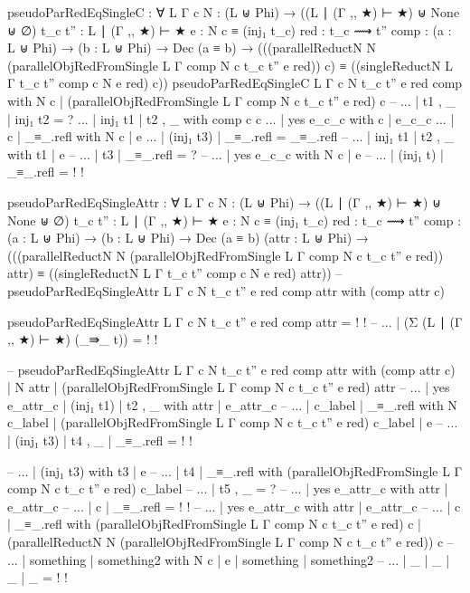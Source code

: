 {\begin{code}
  pseudoParRedEqSingleC : ∀ {L Γ c}
    {N : (L ⊎ Phi) → ((L ∣ (Γ ,, ★) ⊢ ★) ⊎ None ⊎ ∅)}
    {t_c t'' : L ∣ (Γ ,, ★) ⊢ ★}
    {e : N c ≡ (inj₁ t_c)}
    {red : t_c ⟿ t''}
    {comp : (a : L ⊎ Phi) → (b : L ⊎ Phi) → Dec (a ≡ b)}
    → (((parallelReductN N (parallelObjRedFromSingle {L} {Γ} {comp} N c t_c t'' e red)) c)
      ≡ ((singleReductN {L} {Γ} {t_c} {t''} {comp} c N e red) c))
  pseudoParRedEqSingleC  {L} {Γ} {c} {N} {t_c} {t''} {e} {red} {comp} with N c | (parallelObjRedFromSingle {L} {Γ} {comp} N c t_c t'' e red) c
  -- ... | t1 , _ | inj₁ t2 = ?
  ... | inj₁ t1 | t2 , _ with comp c c
  ...   | yes e_c_c with c | e_c_c
  ...     | c | _≡_.refl with N c | e
  ...       | (inj₁ t3) | _≡_.refl = _≡_.refl
  -- ... | inj₁ t1 | t2 , _ with t1 | e
  -- ...   | t3 | _≡_.refl = ?
  -- ...   | yes e_c_c with N c | e
  -- ...     | (inj₁ t) | _≡_.refl = {!   !}


  pseudoParRedEqSingleAttr : ∀ {L Γ c} {N : (L ⊎ Phi) → ((L ∣ (Γ ,, ★) ⊢ ★) ⊎ None ⊎ ∅)} {t_c t'' : L ∣ (Γ ,, ★) ⊢ ★} {e : N c ≡ (inj₁ t_c)} {red : t_c ⟿ t''} {comp : (a : L ⊎ Phi) → (b : L ⊎ Phi) → Dec (a ≡ b)} (attr : L ⊎ Phi) → (((parallelReductN N (parallelObjRedFromSingle {L} {Γ} {comp} N c t_c t'' e red)) attr) ≡ ((singleReductN {L} {Γ} {t_c} {t''} {comp} c N e red) attr))
  -- pseudoParRedEqSingleAttr {L} {Γ} {c} {N} {t_c} {t''} {e} {red} {comp} attr with (comp attr c)

  pseudoParRedEqSingleAttr {L} {Γ} {c} {N} {t_c} {t''} {e} {red} {comp} attr = {!   !}
  -- ... | (Σ (L ∣ (Γ ,, ★) ⊢ ★) (_⇛_ t)) = {!   !}



  -- pseudoParRedEqSingleAttr {L} {Γ} {c} {N} {t_c} {t''} {e} {red} {comp} attr with (comp attr c) | N attr | (parallelObjRedFromSingle {L} {Γ} {comp} N c t_c t'' e red) attr
  -- ... | yes e_attr_c | (inj₁ t1) | t2 , _ with attr | e_attr_c
  -- ...   | c_label | _≡_.refl with N c_label | (parallelObjRedFromSingle {L} {Γ} {comp} N c t_c t'' e red) c_label | e
  -- ...     | (inj₁ t3) | t4 , _ | _≡_.refl = {!   !}


  -- ...     | (inj₁ t3) with t3 | e
  -- ...       | t4 | _≡_.refl with (parallelObjRedFromSingle {L} {Γ} {comp} N c t_c t'' e red) c_label
  -- ...         | t5 , _ = ?
  -- ...   | yes e_attr_c with attr | e_attr_c
  -- ...     | c | _≡_.refl = {!   !}
  -- ... | yes e_attr_c with attr | e_attr_c
  -- ...   | c | _≡_.refl with (parallelObjRedFromSingle {L} {Γ} {comp} N c t_c t'' e red) c | (parallelReductN N (parallelObjRedFromSingle {L} {Γ} {comp} N c t_c t'' e red)) c
  -- ...     | something | something2 with N c | e | something | something2
  -- ...       | _ | _ | _ | _ = {!   !}


\end{code}}
